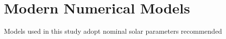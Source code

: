 \section{Modern Numerical Models}
Models used in this study adopt nominal solar parameters recommended 